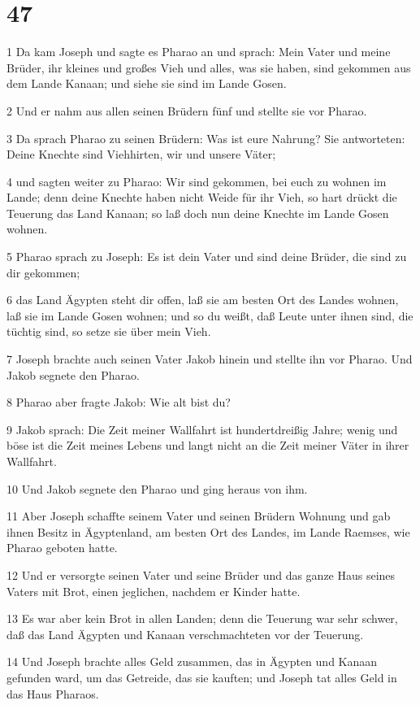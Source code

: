 \chapter{47}

\par 1 Da kam Joseph und sagte es Pharao an und sprach: Mein Vater und meine Brüder, ihr kleines und großes Vieh und alles, was sie haben, sind gekommen aus dem Lande Kanaan; und siehe sie sind im Lande Gosen.
\par 2 Und er nahm aus allen seinen Brüdern fünf und stellte sie vor Pharao.
\par 3 Da sprach Pharao zu seinen Brüdern: Was ist eure Nahrung? Sie antworteten: Deine Knechte sind Viehhirten, wir und unsere Väter;
\par 4 und sagten weiter zu Pharao: Wir sind gekommen, bei euch zu wohnen im Lande; denn deine Knechte haben nicht Weide für ihr Vieh, so hart drückt die Teuerung das Land Kanaan; so laß doch nun deine Knechte im Lande Gosen wohnen.
\par 5 Pharao sprach zu Joseph: Es ist dein Vater und sind deine Brüder, die sind zu dir gekommen;
\par 6 das Land Ägypten steht dir offen, laß sie am besten Ort des Landes wohnen, laß sie im Lande Gosen wohnen; und so du weißt, daß Leute unter ihnen sind, die tüchtig sind, so setze sie über mein Vieh.
\par 7 Joseph brachte auch seinen Vater Jakob hinein und stellte ihn vor Pharao. Und Jakob segnete den Pharao.
\par 8 Pharao aber fragte Jakob: Wie alt bist du?
\par 9 Jakob sprach: Die Zeit meiner Wallfahrt ist hundertdreißig Jahre; wenig und böse ist die Zeit meines Lebens und langt nicht an die Zeit meiner Väter in ihrer Wallfahrt.
\par 10 Und Jakob segnete den Pharao und ging heraus von ihm.
\par 11 Aber Joseph schaffte seinem Vater und seinen Brüdern Wohnung und gab ihnen Besitz in Ägyptenland, am besten Ort des Landes, im Lande Raemses, wie Pharao geboten hatte.
\par 12 Und er versorgte seinen Vater und seine Brüder und das ganze Haus seines Vaters mit Brot, einen jeglichen, nachdem er Kinder hatte.
\par 13 Es war aber kein Brot in allen Landen; denn die Teuerung war sehr schwer, daß das Land Ägypten und Kanaan verschmachteten vor der Teuerung.
\par 14 Und Joseph brachte alles Geld zusammen, das in Ägypten und Kanaan gefunden ward, um das Getreide, das sie kauften; und Joseph tat alles Geld in das Haus Pharaos.
